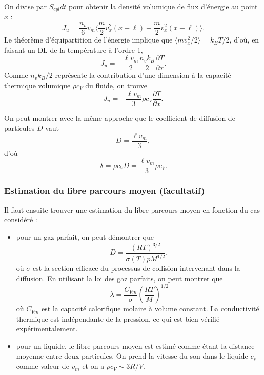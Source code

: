 \documentclass[11pt,a4paper]{report}
\begin{document}
On divise par $S_{cyl}dt$ pour obtenir la densité volumique de flux d'énergie au point $x$ :
\begin{equation}
	J_u = \frac{n_v}{6}v_m \Bigg\langle \frac{m}{2}v_x^2(x-\ell) - \frac{m}{2}v_x^2(x+\ell) \Bigg\rangle.
\end{equation}
Le théorème d'équipartition de l'énergie implique que $\langle mv_x^2/2 \rangle = k_B T/2$, d'où, en faisant un DL de la température à l'ordre 1,
\begin{equation}
	J_u = - \frac{\ell v_m}{2} \frac{n_v k_B}{2} \frac{\partial T}{\partial x}.
\end{equation}
Comme $n_v k_B/2$ représente la contribution d'une dimension à la capacité thermique volumique $\rho c_V$ du fluide, on trouve
\begin{equation}
	J_u = -\frac{\ell v_m}{3}\rho c_V\frac{\partial T}{\partial x}.
\end{equation}

On peut montrer avec la même approche que le coefficient de diffusion de particules $D$ vaut
\begin{equation}
	D = \frac{\ell v_m}{3},
\end{equation}
d'où
\begin{equation}
	\lambda = \rho c_V D = \frac{\ell v_m}{3}\rho c_V.
\end{equation}

\newpage
\subsubsection{Estimation du libre parcours moyen (facultatif)}

Il faut ensuite trouver une estimation du libre parcours moyen en fonction du cas considéré : 
\begin{itemize}
\item pour un gaz parfait, on peut démontrer que
\begin{equation}
	D = \frac{(RT)^{3/2}}{\sigma(T) p M^{1/2}},
\end{equation}
où $\sigma$ est la section efficace du processus de collision intervenant dans la diffusion. 
En utilisant la loi des gaz parfaits, on peut montrer que
\begin{equation}
	\lambda = \frac{C_{Vm}}{\sigma}\left(\frac{RT}{M}\right)^{1/2}
\end{equation}
où $C_{Vm}$ est la capacité calorifique molaire à volume constant. La conductivité thermique est indépendante de la pression, ce qui est bien vérifié expérimentalement.

\item pour un liquide, le libre parcours moyen est estimé comme étant la distance moyenne entre deux particules. On prend la vitesse du son dans le liquide $c_s$ comme valeur de $v_m$ et on a $\rho c_V \sim 3R/V$.
\end{itemize}
\end{document}
